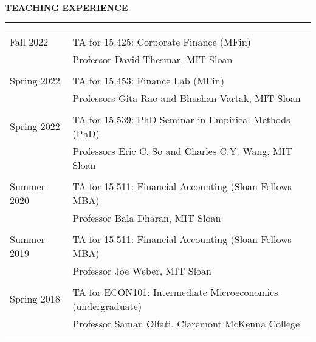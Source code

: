 \documentclass[a4paper, 10pt]{article}
\newcommand{\cvsec}[1]
{
	\needspace{2\baselineskip}
	\noindent \textbf{#1}
	
	\vspace{2pt}
	
	\hrule
	
	\bigskip
}
\newcommand{\cvitem}[2]{#1 & #2 \\ & \\}
\newenvironment{cvchrono}[1]
{
	\cvsec{#1}
	\begin{tabu} to \linewidth {X[1,l]X[6,l]} 
}
{
	\end{tabu}
}
\begin{document}
\begin{cvchrono}{TEACHING EXPERIENCE}
	\cvitem{Fall 2022}{TA for 15.425: Corporate Finance (MFin) \\
		& Professor David Thesmar, MIT Sloan
		}
	\cvitem{Spring 2022}{TA for 15.453: Finance Lab (MFin) \\
		& Professors Gita Rao and Bhushan Vartak, MIT Sloan
		}
	\cvitem{Spring 2022}{TA for 15.539: PhD Seminar in Empirical Methods (PhD) \\
		& Professors Eric C. So and Charles C.Y. Wang, MIT Sloan 
		}
	\cvitem{Summer 2020}{TA for 15.511: Financial Accounting (Sloan Fellows MBA) \\
		& Professor Bala Dharan, MIT Sloan 
		}
	\cvitem{Summer 2019}{TA for 15.511: Financial Accounting (Sloan Fellows MBA) \\
		& Professor Joe Weber, MIT Sloan 
		}
	\cvitem{Spring 2018}{TA for ECON101: Intermediate Microeconomics (undergraduate) \\
		& Professor Saman Olfati, Claremont McKenna College 
		}
\end{cvchrono}
\end{document}

